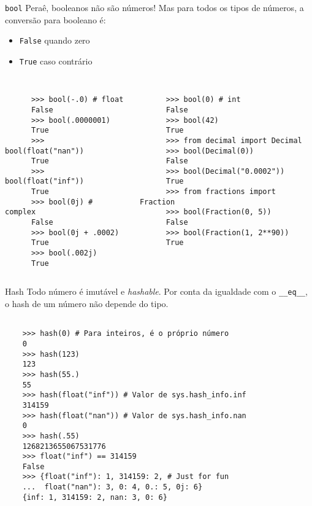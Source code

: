 \documentclass[utf8]{beamer}
\begin{document}
\begin{frame}[fragile]{\texttt{bool}}
  Peraê, booleanos não são números!
  Mas para todos os tipos de números, a conversão para booleano é:

  \begin{itemize}
    \item \texttt{False} quando zero
    \item \texttt{True} caso contrário
  \end{itemize}

  \begin{columns}

    \begin{verbatim}

      >>> bool(-.0) # float
      False
      >>> bool(.0000001)
      True
      >>> bool(float("nan"))
      True
      >>> bool(float("inf"))
      True
      >>> bool(0j) # complex
      False
      >>> bool(0j + .0002)
      True
      >>> bool(.002j)
      True

    \end{verbatim}

    \begin{verbatim}

      >>> bool(0) # int
      False
      >>> bool(42)
      True
      >>> from decimal import Decimal
      >>> bool(Decimal(0))
      False
      >>> bool(Decimal("0.0002"))
      True
      >>> from fractions import Fraction
      >>> bool(Fraction(0, 5))
      False
      >>> bool(Fraction(1, 2**90))
      True

    \end{verbatim}

  \end{columns}
\end{frame}


\begin{frame}[fragile]{Hash}
  Todo número é imutável e \emph{hashable}.
  Por conta da igualdade com o \texttt{__eq__},
  o hash de um número não depende do tipo.

  \begin{verbatim}

    >>> hash(0) # Para inteiros, é o próprio número
    0
    >>> hash(123)
    123
    >>> hash(55.)
    55
    >>> hash(float("inf")) # Valor de sys.hash_info.inf
    314159
    >>> hash(float("nan")) # Valor de sys.hash_info.nan
    0
    >>> hash(.55)
    1268213655067531776
    >>> float("inf") == 314159
    False
    >>> {float("inf"): 1, 314159: 2, # Just for fun
    ...  float("nan"): 3, 0: 4, 0.: 5, 0j: 6}
    {inf: 1, 314159: 2, nan: 3, 0: 6}

  \end{verbatim}

\end{frame}
\end{document}
